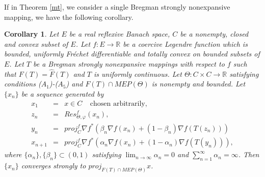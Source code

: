 \documentclass[reqno,b5paper]{amsart}
\theoremstyle{plain}
\newtheorem{corollary}[theorem]{Corollary}
\theoremstyle{definition}
\numberwithin{equation}{section}
\numberwithin{equation}{section}
\begin{document}
If in Theorem \ref{mt}, we consider a single Bregman strongly nonexpansive mapping, we have the following corollary.
\begin{corollary}
Let $E$ be a real reflexive Banach space, $C$ be a nonempty, closed and convex subset of $E$. Let $f:E\to \mathbb{R}$ be a coercive Legendre function which is bounded, uniformly Fr\'{e}chet differentiable and totally convex on bounded subsets of $E$. Let $T$ be a Bregman strongly nonexpansive mappings with respect to $f$ such that $F(T)=\widehat{F}(T)$ and $T$ is uniformly continuous. Let $\Theta:C\times C\to\mathbb{R}$ satisfying conditions ($A_{1}$)-($A_{5}$) and $F(T)\cap MEP(\Theta)$ is nonempty and bounded. Let $\{x_{n}\}$ be a sequence generated by 
\begin{eqnarray*}
x_{1}&=&x\in C \ \ \ \ \  \text{chosen arbitrarily},\nonumber\\
z_{n}&=&Res_{\Theta,\varphi}^{f}(x_{n}),\nonumber\\
y_{n}&=&proj_{C}^{f}\nabla f^{*}(\beta_{n}\nabla f(x_{n})+(1-\beta_{n})\nabla f(T(z_{n})))\nonumber\\
x_{n+1}&=&proj_{C}^{f}\nabla f^{*}(\alpha_{n}\nabla f(x_{n})+(1-\alpha_{n})\nabla f (T(y_{n}))),
\end{eqnarray*}
where $\{\alpha_{n}\},\{\beta_{n}\}\subset (0,1)$ satisfying $\lim_{n\to\infty}\alpha_{n}=0$ and $\sum_{n=1}^{\infty}\alpha_{n}=\infty$. Then $\{x_{n}\}$ converges strongly to $proj_{F(T)\cap MEP(\Theta)}x$.
\end{corollary}
\end{document}
